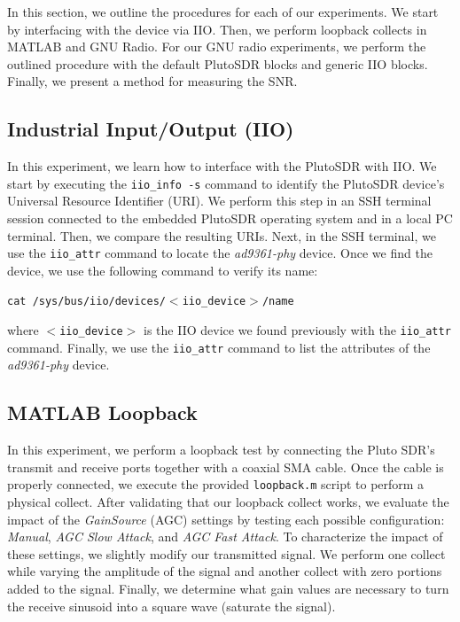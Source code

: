 \documentclass{article}
\begin{document}
In this section, we outline the procedures for each of our experiments. We start by interfacing with the device via IIO. Then, we perform loopback collects in MATLAB and GNU Radio. For our GNU radio experiments, we perform the outlined procedure with the default PlutoSDR blocks and generic IIO blocks. Finally, we present a method for measuring the SNR.

\subsection{Industrial Input/Output (IIO)}
\label{section::industrial_input_output}

In this experiment, we learn how to interface with the PlutoSDR with IIO. We start by executing the \texttt{iio\_info -s} command to identify the PlutoSDR device's Universal Resource Identifier (URI). We perform this step in an SSH terminal session connected to the embedded PlutoSDR operating system and in a local PC terminal. Then, we compare the resulting URIs. Next, in the SSH terminal, we use the \texttt{iio\_attr} command to locate the \textit{ad9361-phy} device. Once we find the device, we use the following command to verify its name:

\begin{center}
\texttt{cat /sys/bus/iio/devices/$<$iio\_device$>$/name}
\end{center}

where \texttt{$<$iio\_device$>$} is the IIO device we found previously with the \texttt{iio\_attr} command. Finally, we use the \texttt{iio\_attr} command to list the attributes of the \textit{ad9361-phy} device.

\subsection{MATLAB Loopback}

In this experiment, we perform a loopback test by connecting the Pluto SDR's transmit and receive ports together with a coaxial SMA cable. Once the cable is properly connected, we execute the provided \texttt{loopback.m} script to perform a physical collect. After validating that our loopback collect works, we evaluate the impact of the \textit{GainSource} (AGC) settings by testing each possible configuration: \textit{Manual}, \textit{AGC Slow Attack}, and \textit{AGC Fast Attack}. To characterize the impact of these settings, we slightly modify our transmitted signal. We perform one collect while varying the amplitude of the signal and another collect with zero portions added to the signal. Finally, we determine what gain values are necessary to turn the receive sinusoid into a square wave (saturate the signal).
\end{document}
